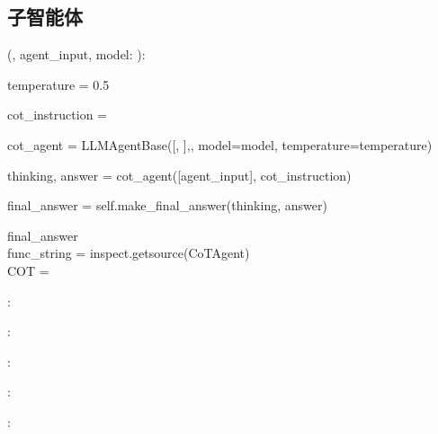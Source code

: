 \subsection{子智能体}
\label{app:sub_agents}


\begin{subagent}[title={CoTAgent}]

  (, agent\_input, model: ):

\quad {}

\quad temperature = 0.5

\quad {}

\quad cot\_instruction = 

\quad {}

\quad cot\_agent = LLMAgentBase([, ],, model=model, temperature=temperature)

\quad thinking, answer =  cot\_agent([agent\_input], cot\_instruction)

\quad final\_answer = self.make\_final\_answer(thinking, answer)

\quad {} final\_answer \\

func\_string = inspect.getsource(CoTAgent) \\

COT = \code{\{}

\quad {}: 

\quad {}: 

\quad {}: \code{\{}

\quad\quad {}: 

\quad \code{\}}

\quad {}: 

\code{\}}


\end{subagent}


